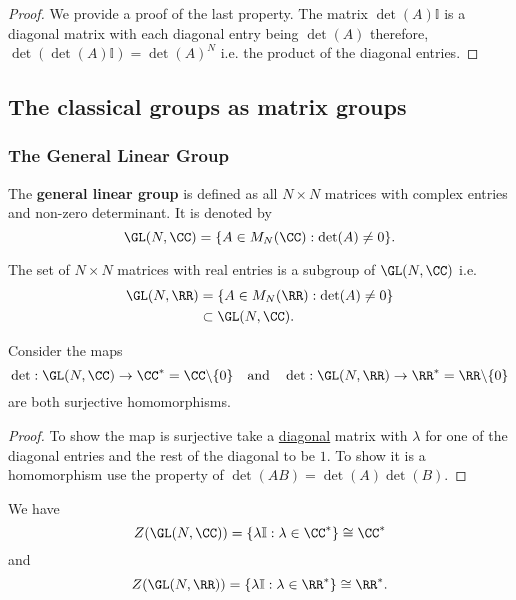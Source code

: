 \documentclass[12pt, a4paper]{article}
\begin{document}
\begin{proof}
    We provide a proof of the last property. The matrix \(\det(A)\mathbb{I}\) is a diagonal matrix with each diagonal entry being \(\det(A)\) therefore, \(\det(\det(A)\mathbb{I})= \det(A)^N\) i.e. the product of the diagonal entries.
\end{proof}

\subsection{The classical groups as matrix groups}

\subsubsection{The General Linear Group}

\begin{definition}
    The \textbf{general linear group} is defined as all \(N\times N\) matrices with complex entries and non-zero determinant. It is denoted by
    \[\GL(N,\CC) =\{A \in M_N(\CC) : \det(A) \neq 0\}.\]
\end{definition}

\begin{corollary}
    The set of \(N \times N\) matrices with real entries is a subgroup of \(\GL(N,\CC)\) i.e.
    \[\begin{aligned}
        \GL(N,\RR) &=\{A \in M_N(\RR) : \det(A) \neq 0\}\\ 
                    &\subset \GL(N,\CC).
    \end{aligned}\]
\end{corollary}

\begin{mdthm}
    Consider the maps
    \[\det : \GL(N,\CC) \to \CC^* = \CC \backslash \{0\} \quad \text{and} \quad \det : \GL(N,\RR) \to \RR^* = \RR \backslash \{0\}\]
    are both surjective homomorphisms.
\end{mdthm}

\begin{proof}
    To show the map is surjective take a \ul{diagonal} matrix with \(\lambda\) for one of the diagonal entries and the rest of the diagonal to be \(1\). To show it is a homomorphism use the property of \(\det(AB)=\det(A)\det(B)\).
\end{proof}

\begin{mdthm}
    We have 
    \[Z(\GL(N,\CC)) = \{\lambda \mathbb{I} : \lambda \in \CC^*\}\cong \CC^*\]
    and
    \[Z(\GL(N,\RR))= \{\lambda \mathbb{I} : \lambda \in \RR^*\} \cong \RR^*.\]
\end{mdthm}
\end{document}
